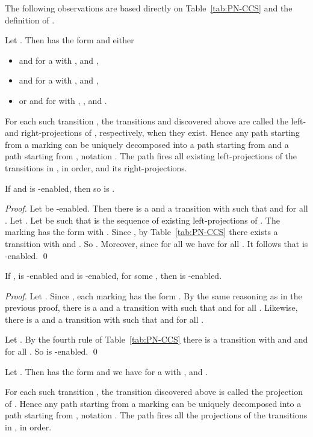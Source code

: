 \documentclass[smallcondensed]{svjour3}
\newcommand{\Tab}[1]{Table~\ref{tab:#1}}
\begin{document}
\noindent
The following observations are based directly on \Tab{PN-CCS} and the definition of .\begin{observation}\label{obs:decompose parallel}\rm Let .
Then  has the form  and either
\begin{itemize}
\vspace{-1ex}
\item  and  for a  with ,
   and ,
\item  and  for a  with ,
   and ,
\item or  and  for
   with , ,
   and .
\end{itemize}
\end{observation}
For each such transition , the transitions  and  discovered above are called the left- and
right-projections of , respectively, when they exist.
Hence any path  starting from a marking  can be uniquely decomposed into a 
path  starting from  and a path  starting from , notation . 
The path  fires all existing left-projections of the transitions in , in order, and
 its right-projections.

\begin{lemma}\label{lem:enabled path}
If  and  is -enabled, then so is . 
\end{lemma}
\begin{proof}
Let  be -enabled. Then there is a  and a transition  with
 such that  and  for all .
Let . 
Let  be such that  is the sequence of existing left-projections of .
The marking  has the form  with .
Since , by \Tab{PN-CCS} there exists a transition  with
 and . So .
Moreover, since  for all  we have  for all .
It follows that  is -enabled.
\qed
\end{proof}

\begin{lemma}\label{lem:enabled path 2}
If ,  is -enabled and  is
-enabled, for some , then  is -enabled.
\end{lemma}
\begin{proof}
Let . Since ,
each marking  has the form .
By the same reasoning as in the previous proof, there is a  and a transition  with  such that
 and  for all .
Likewise, there is a  and a transition  with  such that
 and  for all .

Let . By the fourth rule of \Tab{PN-CCS} there is a transition  with
 and  and
 for all . So  is -enabled.
\qed
\end{proof}

\begin{observation}\label{obs:decompose restriction}\rm
Let .
Then  has the form  and we have
 for a  with ,
 and .
\end{observation}
For each such transition , the transition  discovered above is called the projection of .
Hence any path  starting from a marking  can be uniquely decomposed into a 
path  starting from , notation . 
The path  fires all the projections of the transitions in , in order.
\end{document}
